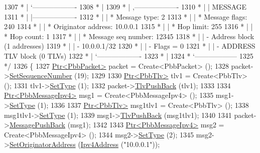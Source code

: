 \begin{DoxyCode}
1307 \textcolor{comment}{         * |    `-------------------}
1308 \textcolor{comment}{         * |}
1309 \textcolor{comment}{         * |    ,-------------------}
1310 \textcolor{comment}{         * |    |  MESSAGE}
1311 \textcolor{comment}{         * |    |-------------------}
1312 \textcolor{comment}{         * |    | * Message type:       2}
1313 \textcolor{comment}{         * |    | * Message flags:  240}
1314 \textcolor{comment}{         * |    | * Originator address: 10.0.0.1}
1315 \textcolor{comment}{         * |    | * Hop limit:          255}
1316 \textcolor{comment}{         * |    | * Hop count:          1}
1317 \textcolor{comment}{         * |    | * Message seq number: 12345}
1318 \textcolor{comment}{         * |    | - Address block (1 addresses)}
1319 \textcolor{comment}{         * |    |     - 10.0.0.1/32}
1320 \textcolor{comment}{         * |    |     - Flags = 0}
1321 \textcolor{comment}{         * |    | - ADDRESS TLV block (0 TLVs)}
1322 \textcolor{comment}{         * |    `-------------------}
1323 \textcolor{comment}{         * |}
1324 \textcolor{comment}{         * `------------------}
1325 \textcolor{comment}{   */}
1326   \{
1327     \hyperlink{classns3_1_1Ptr}{Ptr<PbbPacket>} packet = Create<PbbPacket> ();
1328     packet->\hyperlink{classns3_1_1PbbPacket_a7d6a1602be86109760d0f26ff9bbbb8e}{SetSequenceNumber} (19);
1329 
1330     \hyperlink{classns3_1_1Ptr}{Ptr<PbbTlv>} tlv1 = Create<PbbTlv> ();
1331     tlv1->\hyperlink{classns3_1_1PbbTlv_a90a0452018ed364ac37c3ad116dd718b}{SetType} (1);
1332     packet->\hyperlink{classns3_1_1PbbPacket_a34935793e729a106c176db99c969cb42}{TlvPushBack} (tlv1);
1333 
1334     \hyperlink{classns3_1_1Ptr}{Ptr<PbbMessageIpv4>} msg1 = Create<PbbMessageIpv4> ();
1335     msg1->\hyperlink{classns3_1_1PbbMessage_a4b3d1eaabd3e7412a46ac79bf3360dac}{SetType} (1);
1336 
1337     \hyperlink{classns3_1_1Ptr}{Ptr<PbbTlv>} msg1tlv1 = Create<PbbTlv> ();
1338     msg1tlv1->\hyperlink{classns3_1_1PbbTlv_a90a0452018ed364ac37c3ad116dd718b}{SetType} (1);
1339     msg1->\hyperlink{classns3_1_1PbbMessage_aac70b2672f79765cf5cc5b6666018165}{TlvPushBack} (msg1tlv1);
1340 
1341     packet->\hyperlink{classns3_1_1PbbPacket_a4a3170001ef758d9c9c4375b8f089826}{MessagePushBack} (msg1);
1342 
1343     \hyperlink{classns3_1_1Ptr}{Ptr<PbbMessageIpv4>} msg2 = Create<PbbMessageIpv4> ();
1344     msg2->\hyperlink{classns3_1_1PbbMessage_a4b3d1eaabd3e7412a46ac79bf3360dac}{SetType} (2);
1345     msg2->\hyperlink{classns3_1_1PbbMessage_a52ac135a2bec53db5e8f46b8b8a25e7c}{SetOriginatorAddress} (\hyperlink{classns3_1_1Ipv4Address}{Ipv4Address} (\textcolor{stringliteral}{"10.0.0.1"}));

\end{DoxyCode}
